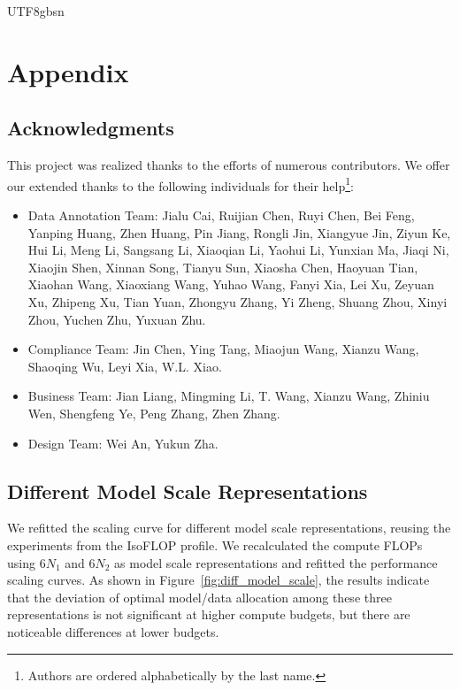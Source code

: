 \documentclass[11pt, a4paper, logo, copyright, nonumbering]{deepseek}
\begin{document}
\begin{CJK*}{UTF8}{gbsn}
\begin{itemize}
\end{itemize}



\newpage
\appendix

\section{Appendix}

\subsection{Acknowledgments}
This project was realized thanks to the efforts of numerous contributors. We offer our extended thanks to the following individuals for their help\footnote{Authors are ordered alphabetically by the last name.}:
\begin{itemize}
    \item Data Annotation Team: Jialu Cai, Ruijian Chen, Ruyi Chen, Bei Feng, Yanping Huang, Zhen Huang, Pin Jiang, Rongli Jin, Xiangyue Jin, Ziyun Ke, Hui Li, Meng Li, Sangsang Li, Xiaoqian Li, Yaohui Li, Yunxian Ma, Jiaqi Ni, Xiaojin Shen, Xinnan Song, Tianyu Sun, Xiaosha Chen, Haoyuan Tian, Xiaohan Wang, Xiaoxiang Wang, Yuhao Wang, Fanyi Xia, Lei Xu, Zeyuan Xu, Zhipeng Xu, Tian Yuan, Zhongyu Zhang, Yi Zheng, Shuang Zhou, Xinyi Zhou, Yuchen Zhu, Yuxuan Zhu.
    \item Compliance Team: Jin Chen, Ying Tang, Miaojun Wang, Xianzu Wang, Shaoqing Wu, Leyi Xia, W.L. Xiao.
    \item Business Team: Jian Liang, Mingming Li, T. Wang, Xianzu Wang, Zhiniu Wen, Shengfeng Ye, Peng Zhang, Zhen Zhang.
    \item Design Team: Wei An, Yukun Zha.
\end{itemize}


\subsection{Different Model Scale Representations}
\label{appendix:diff_model_scale_repre}

We refitted the scaling curve for different model scale representations, reusing the experiments from the IsoFLOP profile. We recalculated the compute FLOPs using $6N_1$ and $6N_2$ as model scale representations and refitted the performance scaling curves. As shown in Figure~\ref{fig:diff_model_scale}, the results indicate that the deviation of optimal model/data allocation among these three representations is not significant at higher compute budgets, but there are noticeable differences at lower budgets.


\end{CJK*}
\end{document}
